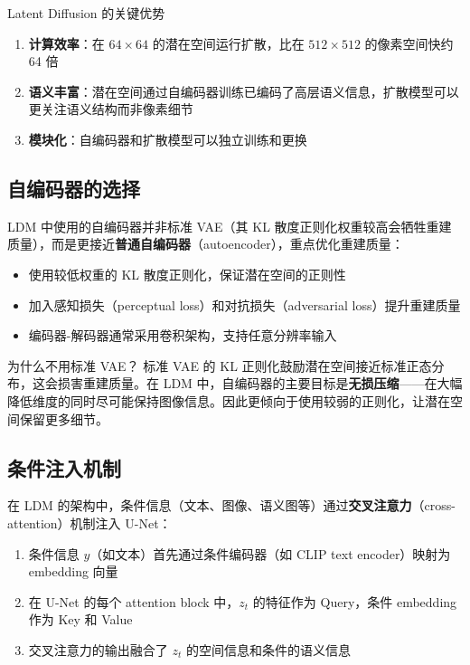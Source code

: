 \begin{importantbox}{Latent Diffusion 的关键优势}
\begin{enumerate}
    \item \textbf{计算效率}：在 $64\times64$ 的潜在空间运行扩散，比在 $512\times512$ 的像素空间快约 64 倍
    \item \textbf{语义丰富}：潜在空间通过自编码器训练已编码了高层语义信息，扩散模型可以更关注语义结构而非像素细节
    \item \textbf{模块化}：自编码器和扩散模型可以独立训练和更换
\end{enumerate}
\end{importantbox}

\subsection{自编码器的选择}

LDM 中使用的自编码器并非标准 VAE（其 KL 散度正则化权重较高会牺牲重建质量），而是更接近\textbf{普通自编码器}（autoencoder），重点优化重建质量：

\begin{itemize}
    \item 使用较低权重的 KL 散度正则化，保证潜在空间的正则性
    \item 加入感知损失（perceptual loss）和对抗损失（adversarial loss）提升重建质量
    \item 编码器-解码器通常采用卷积架构，支持任意分辨率输入
\end{itemize}

\begin{knowledgebox}{为什么不用标准 VAE？}
标准 VAE 的 KL 正则化鼓励潜在空间接近标准正态分布，这会损害重建质量。在 LDM 中，自编码器的主要目标是\textbf{无损压缩}——在大幅降低维度的同时尽可能保持图像信息。因此更倾向于使用较弱的正则化，让潜在空间保留更多细节。
\end{knowledgebox}

\subsection{条件注入机制}

在 LDM 的架构中，条件信息（文本、图像、语义图等）通过\textbf{交叉注意力}（cross-attention）机制注入 U-Net：

\begin{enumerate}
    \item 条件信息 $y$（如文本）首先通过条件编码器（如 CLIP text encoder）映射为 embedding 向量
    \item 在 U-Net 的每个 attention block 中，$z_t$ 的特征作为 Query，条件 embedding 作为 Key 和 Value
    \item 交叉注意力的输出融合了 $z_t$ 的空间信息和条件的语义信息
\end{enumerate}

